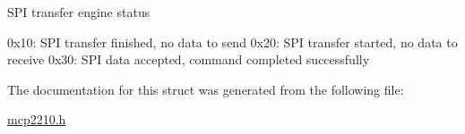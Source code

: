 \-S\-P\-I transfer engine status

0x10\-: \-S\-P\-I transfer finished, no data to send 0x20\-: \-S\-P\-I transfer started, no data to receive 0x30\-: \-S\-P\-I data accepted, command completed successfully 

\-The documentation for this struct was generated from the following file\-:\begin{DoxyCompactItemize}
\item 
\hyperlink{mcp2210_8h}{mcp2210.\-h}\end{DoxyCompactItemize}
